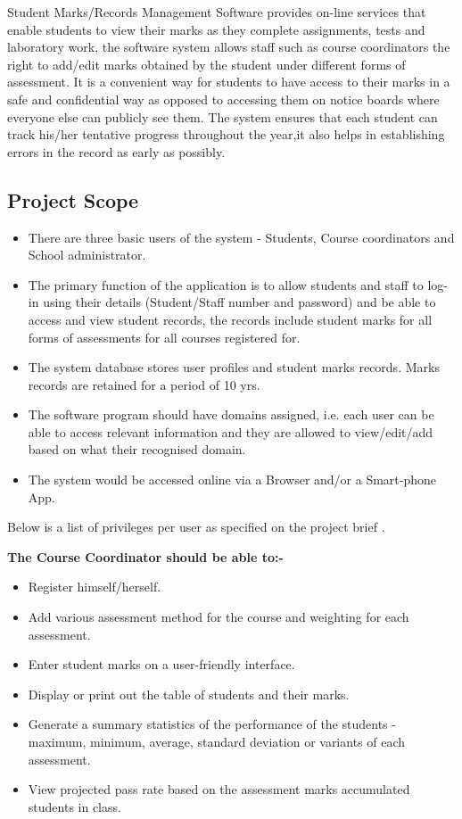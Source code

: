 \documentclass[10pt,onecolumn]{RequimentsGathering}
\begin{document}
Student Marks/Records Management Software provides on-line services that enable students to view their marks as they complete  assignments, tests and laboratory work, the software system allows staff such as course coordinators the right to add/edit marks obtained by the student under different forms of assessment. It is a convenient way for students to have access to their marks in a safe and confidential way as opposed to accessing them on notice boards where everyone else can publicly see them. The system ensures that each student can track his/her tentative progress throughout the year,it also helps in establishing errors in the record as early as possibly. 

\subsection{Project Scope}
\begin{itemize}

\item There are three basic users of the system - Students, Course coordinators and School administrator.
\item The primary function of the application is to allow students and staff  to log-in using their details (Student/Staff number and password) and be able to access and view student records, the records include student marks for all forms of assessments for all courses registered for. 
\item The system database stores user profiles and student marks records. Marks records are retained for a period of 10 yrs.
\item The software program should have domains assigned, i.e. each user can be able to access relevant  information and they are allowed to view/edit/add based on what their recognised  domain.
\item  The system would be accessed online via a Browser and/or a Smart-phone App.

\end{itemize}

Below is a list of privileges per user as specified on the project brief \cite{ref9}.

\textbf{The Course Coordinator should be able to:-}
\begin{itemize}
\item Register himself/herself.
\item Add various assessment method for the course and weighting for each assessment.
\item Enter student marks on a user-friendly interface.
\item Display or print out the table of students and their marks.
\item Generate a summary statistics of the performance of the students - maximum, minimum, average, standard deviation or variants of each assessment.  
\item View projected pass rate based on the assessment marks accumulated students in class.
\end{itemize}
\end{document}
